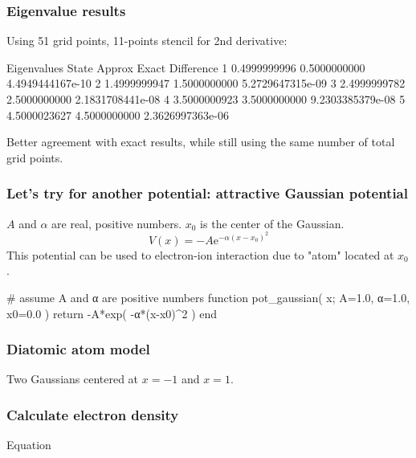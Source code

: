 \begin{frame}[fragile]
\frametitle{Eigenvalue results}

Using 51 grid points, 11-points stencil for 2nd derivative:
\begin{textcode}
Eigenvalues
State         Approx              Exact          Difference
   1       0.4999999996       0.5000000000   4.4949444167e-10
   2       1.4999999947       1.5000000000   5.2729647315e-09
   3       2.4999999782       2.5000000000   2.1831708441e-08
   4       3.5000000923       3.5000000000   9.2303385379e-08
   5       4.5000023627       4.5000000000   2.3626997363e-06
\end{textcode}

Better agreement with exact results, while still using the same number of total
grid points.

\end{frame}


\begin{frame}[fragile]
\frametitle{Let's try for another potential: attractive Gaussian potential}

$A$ and $\alpha$ are real, positive numbers.
$x_0$ is the center of the Gaussian.
\begin{equation*}
V(x) = -A \mathrm{e}^{-\alpha (x - x_0)^2}
\end{equation*}
This potential can be used to electron-ion interaction due to "atom" located
at $x_0$.

\begin{juliacode}
# assume A and α are positive numbers
function pot_gaussian( x; A=1.0, α=1.0, x0=0.0 )
    return -A*exp( -α*(x-x0)^2 )
end
\end{juliacode}

\end{frame}


\begin{frame}
\frametitle{Diatomic atom model}

Two Gaussians centered at $x = -1$ and $x = 1$.

\end{frame}



\begin{frame}
\frametitle{Calculate electron density}

Equation

\end{frame}







